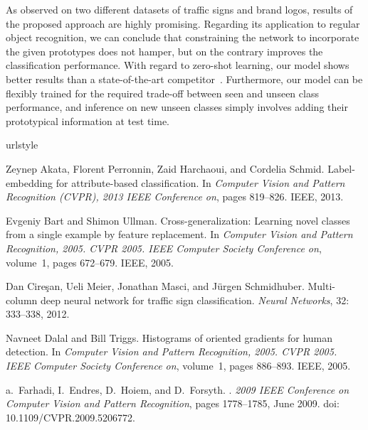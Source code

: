 \documentclass{bmvc2k}
\begin{document}
As observed on two different datasets of traffic signs and brand logos, results
of the proposed approach are highly promising.
Regarding its application to regular object recognition, we can conclude that constraining the
network to incorporate the given prototypes does not hamper, but on the contrary
 improves the classification performance. With regard to zero-shot learning, our model shows better results than a state-of-the-art competitor~\cite{norouzi2013zero}. Furthermore,  
our model can be flexibly trained for the required trade-off between seen and unseen class performance, 
and inference on new unseen classes simply involves adding their prototypical
information at test time.

\begin{thebibliography}{23}
\providecommand{\natexlab}[1]{#1}
\providecommand{\url}[1]{\texttt{#1}}
\expandafter\ifx\csname urlstyle\endcsname\relax
  \providecommand{\doi}[1]{doi: #1}\else
  \providecommand{\doi}{doi: \begingroup \urlstyle{rm}\Url}\fi

Zeynep Akata, Florent Perronnin, Zaid Harchaoui, and Cordelia Schmid.
\newblock Label-embedding for attribute-based classification.
\newblock In \emph{Computer Vision and Pattern Recognition (CVPR), 2013 IEEE
  Conference on}, pages 819--826. IEEE, 2013.

Evgeniy Bart and Shimon Ullman.
\newblock Cross-generalization: Learning novel classes from a single example by
  feature replacement.
\newblock In \emph{Computer Vision and Pattern Recognition, 2005. CVPR 2005.
  IEEE Computer Society Conference on}, volume~1, pages 672--679. IEEE, 2005.

Dan Cire{\c{s}}an, Ueli Meier, Jonathan Masci, and J{\"u}rgen Schmidhuber.
\newblock Multi-column deep neural network for traffic sign classification.
\newblock \emph{Neural Networks}, 32: 333--338, 2012.

Navneet Dalal and Bill Triggs.
\newblock Histograms of oriented gradients for human detection.
\newblock In \emph{Computer Vision and Pattern Recognition, 2005. CVPR 2005.
  IEEE Computer Society Conference on}, volume~1, pages 886--893. IEEE, 2005.

a.~Farhadi, I.~Endres, D.~Hoiem, and D.~Forsyth.
.
\newblock \emph{2009 IEEE Conference on Computer Vision and Pattern
  Recognition}, pages 1778--1785, June 2009.
\newblock \doi{10.1109/CVPR.2009.5206772}.


\end{thebibliography}
\end{document}
